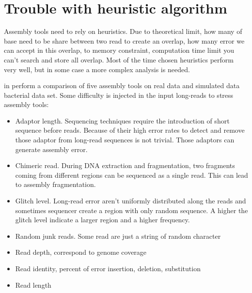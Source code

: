 \documentclass[main.tex]{subfiles}
\begin{document}


\section{Trouble with heuristic algorithm}

Assembly tools need to rely on heuristics. Due to theoretical limit, how many of base need to be share between two read to create an overlap, how many error we can accept in this overlap, to memory constraint, computation time limit you can't search and store all overlap.%
Most of the time chosen heuristics perform  very well, but in some case a more complex analysis is needed.

\citeauthor{long_read_assembler_comparison} in \cite{long_read_assembler_comparison} perform a comparison of five assembly tools on real data and simulated data bacterial data set. Some difficulty is injected in the input long-reads to stress assembly tools:
\begin{itemize}
    \item Adaptor length. Sequencing techniques require the introduction of short sequence before reads. Because of their high error rates to detect and remove those adaptor from long-read sequences is not trivial. Those adaptors can generate  assembly error.
    \item Chimeric read. During DNA extraction and fragmentation, two fragments coming from different regions can be  sequenced as a single read. This can lead to assembly fragmentation.
    \item Glitch level. Long-read error aren't uniformly distributed along the reads and sometimes sequencer create a region with only random sequence. A higher the glitch level indicate a larger region and a higher frequency. 
    \item Random junk reads. Some read are just a string of random character
    \item Read depth, correspond to genome coverage
    \item Read identity, percent of error insertion, deletion, substitution 
    \item Read length
\end{itemize}
\end{document}
